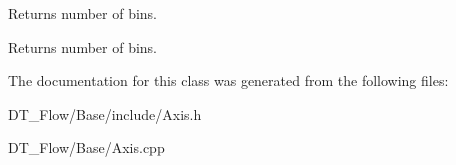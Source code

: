 Returns number of bins. \begin{DoxyReturn}{Returns}
number of bins. 
\end{DoxyReturn}


The documentation for this class was generated from the following files\+:\begin{DoxyCompactItemize}
\item 
D\+T\+\_\+\+Flow/\+Base/include/Axis.\+h\item 
D\+T\+\_\+\+Flow/\+Base/Axis.\+cpp\end{DoxyCompactItemize}
